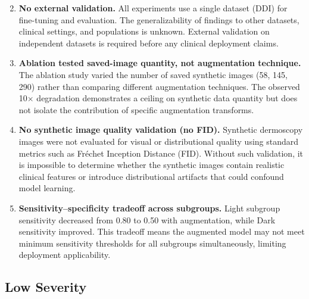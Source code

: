 \begin{enumerate}
    \setcounter{enumi}{1}
    \item \textbf{No external validation.} All experiments use a single dataset (DDI) for fine-tuning and evaluation. The generalizability of findings to other datasets, clinical settings, and populations is unknown. External validation on independent datasets is required before any clinical deployment claims.

    \item \textbf{Ablation tested saved-image quantity, not augmentation technique.} The ablation study varied the number of saved synthetic images (58, 145, 290) rather than comparing different augmentation techniques. The observed 10$\times$ degradation demonstrates a ceiling on synthetic data quantity but does not isolate the contribution of specific augmentation transforms.

    \item \textbf{No synthetic image quality validation (no FID).} Synthetic dermoscopy images were not evaluated for visual or distributional quality using standard metrics such as Fr\'echet Inception Distance (FID). Without such validation, it is impossible to determine whether the synthetic images contain realistic clinical features or introduce distributional artifacts that could confound model learning.

    \item \textbf{Sensitivity--specificity tradeoff across subgroups.} Light subgroup sensitivity decreased from 0.80 to 0.50 with augmentation, while Dark sensitivity improved. This tradeoff means the augmented model may not meet minimum sensitivity thresholds for all subgroups simultaneously, limiting deployment applicability.
\end{enumerate}

\subsection{Low Severity}

